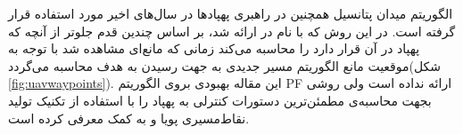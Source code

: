 الگوریتم میدان پتانسیل همچنین در راهبری پهپادها در سال‌های اخیر مورد استفاده قرار گرفته است. در این روش که با نام  در  ارائه شد، بر اساس  چندین قدم جلوتر از آنچه که پهپاد در آن قرار دارد را محاسبه می‌کند زمانی که مانع‌ای مشاهده شد با توجه به موقعیت مانع الگوریتم  مسیر جدیدی به جهت رسیدن به هدف محاسبه می‌گردد(شکل \ref{fig:uavwaypoints}). این مقاله بهبودی بروی الگوریتم PF ارائه نداده است ولی روشی بجهت محاسبه‌ی مطمئن‌ترین دستورات کنترلی به پهپاد را با استفاده از تکنیک تولید نقاط‌مسیری پویا و به کمک  معرفی کرده است.

